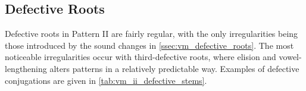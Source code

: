 \documentclass[grammar]{subfiles}
\begin{document}
\subsection{Defective Roots}
\label{ssec:vm_ii_defective}

Defective roots in Pattern II are fairly regular, with the only irregularities
being those introduced by the sound changes in \cref{ssec:vm_defective_roots}.
The most noticeable irregularities occur with third-defective roots, where
elision and vowel-lengthening alters patterns in a relatively predictable way.
Examples of defective conjugations are given in
\cref{tab:vm_ii_defective_stems}. 

\end{document}
